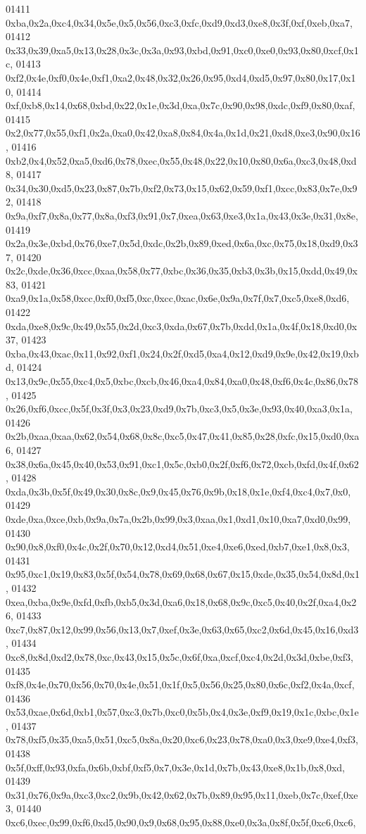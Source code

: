 \begin{DoxyCode}
01411   0xba,0x2a,0xc4,0x34,0x5e,0x5,0x56,0xc3,0xfc,0xd9,0xd3,0xe8,0x3f,0xf,0xeb,0xa7,
01412   0x33,0x39,0xa5,0x13,0x28,0x3c,0x3a,0x93,0xbd,0x91,0xc0,0xe0,0x93,0x80,0xcf,0x1c,
01413   0xf2,0x4e,0xf0,0x4e,0xf1,0xa2,0x48,0x32,0x26,0x95,0xd4,0xd5,0x97,0x80,0x17,0x10,
01414   0xf,0xb8,0x14,0x68,0xbd,0x22,0x1e,0x3d,0xa,0x7c,0x90,0x98,0xdc,0xf9,0x80,0xaf,
01415   0x2,0x77,0x55,0xf1,0x2a,0xa0,0x42,0xa8,0x84,0x4a,0x1d,0x21,0xd8,0xe3,0x90,0x16,
01416   0xb2,0x4,0x52,0xa5,0xd6,0x78,0xec,0x55,0x48,0x22,0x10,0x80,0x6a,0xc3,0x48,0xd8,
01417   0x34,0x30,0xd5,0x23,0x87,0x7b,0xf2,0x73,0x15,0x62,0x59,0xf1,0xcc,0x83,0x7e,0x92,
01418   0x9a,0xf7,0x8a,0x77,0x8a,0xf3,0x91,0x7,0xea,0x63,0xe3,0x1a,0x43,0x3e,0x31,0x8e,
01419   0x2a,0x3e,0xbd,0x76,0xe7,0x5d,0xdc,0x2b,0x89,0xed,0x6a,0xc,0x75,0x18,0xd9,0x37,
01420   0x2c,0xde,0x36,0xcc,0xaa,0x58,0x77,0xbc,0x36,0x35,0xb3,0x3b,0x15,0xdd,0x49,0x83,
01421   0xa9,0x1a,0x58,0xcc,0xf0,0xf5,0xc,0xcc,0xac,0x6e,0x9a,0x7f,0x7,0xc5,0xe8,0xd6,
01422   0xda,0xe8,0x9c,0x49,0x55,0x2d,0xc3,0xda,0x67,0x7b,0xdd,0x1a,0x4f,0x18,0xd0,0x37,
01423   0xba,0x43,0xac,0x11,0x92,0xf1,0x24,0x2f,0xd5,0xa4,0x12,0xd9,0x9e,0x42,0x19,0xbd,
01424   0x13,0x9c,0x55,0xc4,0x5,0xbc,0xcb,0x46,0xa4,0x84,0xa0,0x48,0xf6,0x4c,0x86,0x78,
01425   0x26,0xf6,0xcc,0x5f,0x3f,0x3,0x23,0xd9,0x7b,0xc3,0x5,0x3e,0x93,0x40,0xa3,0x1a,
01426   0x2b,0xaa,0xaa,0x62,0x54,0x68,0x8c,0xc5,0x47,0x41,0x85,0x28,0xfc,0x15,0xd0,0xa6,
01427   0x38,0x6a,0x45,0x40,0x53,0x91,0xc1,0x5c,0xb0,0x2f,0xf6,0x72,0xcb,0xfd,0x4f,0x62,
01428   0xda,0x3b,0x5f,0x49,0x30,0x8c,0x9,0x45,0x76,0x9b,0x18,0x1e,0xf4,0xc4,0x7,0x0,
01429   0xde,0xa,0xce,0xb,0x9a,0x7a,0x2b,0x99,0x3,0xaa,0x1,0xd1,0x10,0xa7,0xd0,0x99,
01430   0x90,0x8,0xf0,0x4c,0x2f,0x70,0x12,0xd4,0x51,0xe4,0xe6,0xed,0xb7,0xe1,0x8,0x3,
01431   0x95,0xc1,0x19,0x83,0x5f,0x54,0x78,0x69,0x68,0x67,0x15,0xde,0x35,0x54,0x8d,0x1,
01432   0xea,0xba,0x9e,0xfd,0xfb,0xb5,0x3d,0xa6,0x18,0x68,0x9c,0xc5,0x40,0x2f,0xa4,0x26,
01433   0xc7,0x87,0x12,0x99,0x56,0x13,0x7,0xef,0x3e,0x63,0x65,0xc2,0x6d,0x45,0x16,0xd3,
01434   0xc8,0x8d,0xd2,0x78,0xc,0x43,0x15,0x5c,0x6f,0xa,0xcf,0xc4,0x2d,0x3d,0xbe,0xf3,
01435   0xf8,0x4e,0x70,0x56,0x70,0x4e,0x51,0x1f,0x5,0x56,0x25,0x80,0x6c,0xf2,0x4a,0xcf,
01436   0x53,0xae,0x6d,0xb1,0x57,0xc3,0x7b,0xc0,0x5b,0x4,0x3e,0xf9,0x19,0x1c,0xbc,0x1e,
01437   0x78,0xf5,0x35,0xa5,0x51,0xc5,0x8a,0x20,0xc6,0x23,0x78,0xa0,0x3,0xe9,0xe4,0xf3,
01438   0x5f,0xff,0x93,0xfa,0x6b,0xbf,0xf5,0x7,0x3e,0x1d,0x7b,0x43,0xe8,0x1b,0x8,0xd,
01439   0x31,0x76,0x9a,0xc3,0xc2,0x9b,0x42,0x62,0x7b,0x89,0x95,0x11,0xeb,0x7c,0xef,0xe3,
01440   0xc6,0xec,0x99,0xf6,0xd5,0x90,0x9,0x68,0x95,0x88,0xe0,0x3a,0x8f,0x5f,0xc6,0xc6,

\end{DoxyCode}
